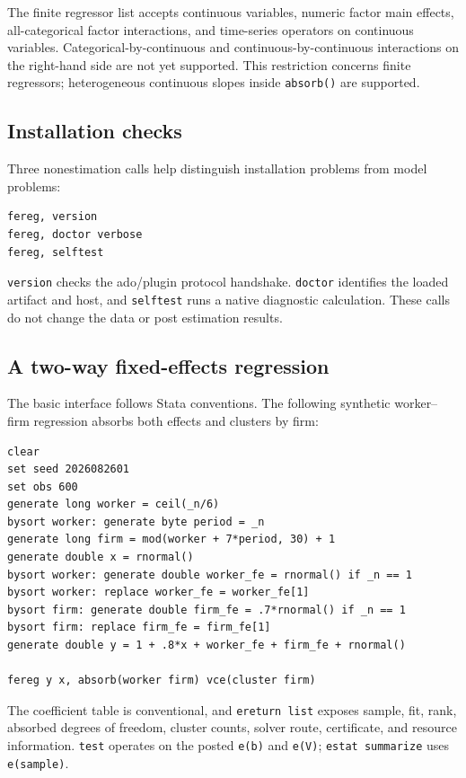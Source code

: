 \documentclass[11pt]{article}
\begin{document}
The finite regressor list accepts continuous variables, numeric factor main
effects, all-categorical factor interactions, and time-series operators on
continuous variables.  Categorical-by-continuous and
continuous-by-continuous interactions on the right-hand side are not yet
supported.  This restriction concerns finite regressors; heterogeneous
continuous slopes inside \texttt{absorb()} are supported.

\subsection{Installation checks}

Three nonestimation calls help distinguish installation problems from model
problems:
\begin{lstlisting}
fereg, version
fereg, doctor verbose
fereg, selftest
\end{lstlisting}
\texttt{version} checks the ado/plugin protocol handshake.
\texttt{doctor} identifies the loaded artifact and host, and
\texttt{selftest} runs a native diagnostic calculation.  These calls do not
change the data or post estimation results.

\subsection{A two-way fixed-effects regression}
\label{sec:example-basic}

The basic interface follows Stata conventions.  The following synthetic
worker--firm regression absorbs both effects and clusters by firm:
\begin{lstlisting}
clear
set seed 2026082601
set obs 600
generate long worker = ceil(_n/6)
bysort worker: generate byte period = _n
generate long firm = mod(worker + 7*period, 30) + 1
generate double x = rnormal()
bysort worker: generate double worker_fe = rnormal() if _n == 1
bysort worker: replace worker_fe = worker_fe[1]
bysort firm: generate double firm_fe = .7*rnormal() if _n == 1
bysort firm: replace firm_fe = firm_fe[1]
generate double y = 1 + .8*x + worker_fe + firm_fe + rnormal()

fereg y x, absorb(worker firm) vce(cluster firm)
\end{lstlisting}
The coefficient table is conventional, and \texttt{ereturn list} exposes
sample, fit, rank, absorbed degrees of freedom, cluster counts, solver route,
certificate, and resource information.  \texttt{test} operates on the posted
\texttt{e(b)} and \texttt{e(V)}; \texttt{estat summarize} uses
\texttt{e(sample)}.
\end{document}
